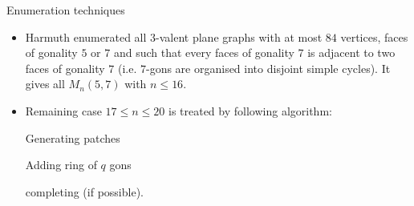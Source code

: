 \documentclass[%
pdf,
colorBG,
slideColor,
]{prosper}
\begin{document}
\begin{slide}{Enumeration techniques}
\vspace{-3mm}
\begin{itemize}
\item Harmuth enumerated all $3$-valent plane graphs with at most $84$ vertices, faces of gonality $5$ or $7$ and such that every faces of gonality $7$ is adjacent to two faces of gonality $7$ (i.e. $7$-gons are organised into disjoint simple cycles).
It gives all $M_{n}(5,7)$ with $n\leq 16$.
\item Remaining case $17\leq n\leq 20$ is treated by following algorithm:
\begin{center}
\begin{minipage}{3.5cm}
\centering
{}\par
Generating patches
\end{minipage}
\begin{minipage}{3.5cm}
\centering
{}\par
Adding ring of $q$ gons
\end{minipage}
\begin{minipage}{3.5cm}
\centering
{}\par
completing (if possible).
\end{minipage}
\end{center}


\end{itemize}

\end{slide}
\end{document}
